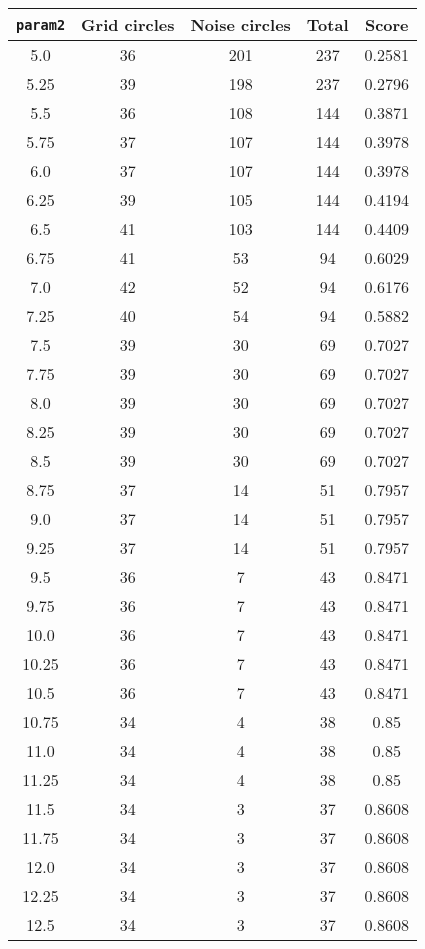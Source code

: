\documentclass[letterpaper, 12pt]{article}
\begin{document}
\begin{longtable}{|c|c|c|c|c|}
\hline
\textbf{\texttt{param2}} & \textbf{Grid circles} & \textbf{Noise circles} & \textbf{Total} & \textbf{Score} \\
\hline
5.0 & 36 & 201 & 237 & 0.2581 \\
\hline
5.25 & 39 & 198 & 237 & 0.2796 \\
\hline
5.5 & 36 & 108 & 144 & 0.3871 \\
\hline
5.75 & 37 & 107 & 144 & 0.3978 \\
\hline
6.0 & 37 & 107 & 144 & 0.3978 \\
\hline
6.25 & 39 & 105 & 144 & 0.4194 \\
\hline
6.5 & 41 & 103 & 144 & 0.4409 \\
\hline
6.75 & 41 & 53 & 94 & 0.6029 \\
\hline
7.0 & 42 & 52 & 94 & 0.6176 \\
\hline
7.25 & 40 & 54 & 94 & 0.5882 \\
\hline
7.5 & 39 & 30 & 69 & 0.7027 \\
\hline
7.75 & 39 & 30 & 69 & 0.7027 \\
\hline
8.0 & 39 & 30 & 69 & 0.7027 \\
\hline
8.25 & 39 & 30 & 69 & 0.7027 \\
\hline
8.5 & 39 & 30 & 69 & 0.7027 \\
\hline
8.75 & 37 & 14 & 51 & 0.7957 \\
\hline
9.0 & 37 & 14 & 51 & 0.7957 \\
\hline
9.25 & 37 & 14 & 51 & 0.7957 \\
\hline
9.5 & 36 & 7 & 43 & 0.8471 \\
\hline
9.75 & 36 & 7 & 43 & 0.8471 \\
\hline
10.0 & 36 & 7 & 43 & 0.8471 \\
\hline
10.25 & 36 & 7 & 43 & 0.8471 \\
\hline
10.5 & 36 & 7 & 43 & 0.8471 \\
\hline
10.75 & 34 & 4 & 38 & 0.85 \\
\hline
11.0 & 34 & 4 & 38 & 0.85 \\
\hline
11.25 & 34 & 4 & 38 & 0.85 \\
\hline
11.5 & 34 & 3 & 37 & 0.8608 \\
\hline
11.75 & 34 & 3 & 37 & 0.8608 \\
\hline
12.0 & 34 & 3 & 37 & 0.8608 \\
\hline
12.25 & 34 & 3 & 37 & 0.8608 \\
\hline
12.5 & 34 & 3 & 37 & 0.8608 \\

\end{longtable}
\end{document}
